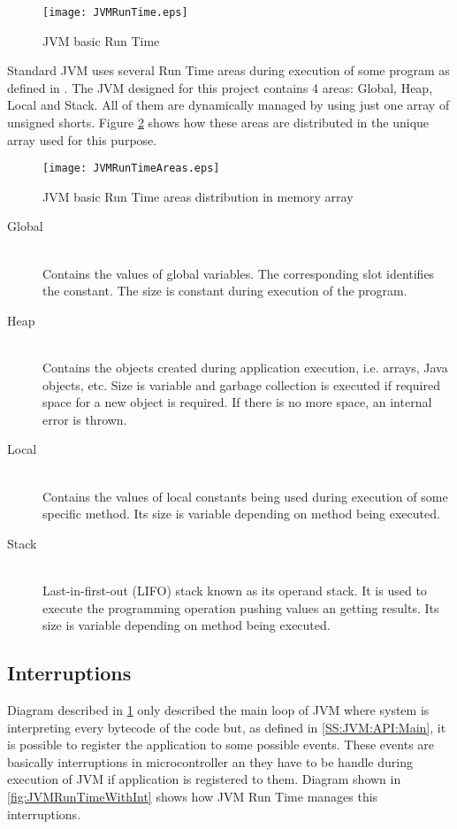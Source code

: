 \begin{figure}[H]
\centering
\texttt{[image: JVMRunTime.eps]}
\caption{JVM basic Run Time}
\label{fig:JVMRunTime}
\end{figure}

Standard JVM uses several Run Time areas during execution of some program as defined in \cite{Art:JVMSE7}. The JVM designed for this project contains 4 areas: Global, Heap, Local and Stack. All of them are dynamically managed by using just one array of unsigned shorts. Figure \ref{fig:JVMRunTimeAreas} shows how these areas are distributed in the unique array used for this purpose.

\begin{figure}[H]
\centering
\texttt{[image: JVMRunTimeAreas.eps]}
\caption{JVM basic Run Time areas distribution in memory array}
\label{fig:JVMRunTimeAreas}
\end{figure}

\begin{description}
\item[Global] \hfill \\
Contains the values of global variables. The corresponding slot identifies the constant. The size is constant during execution of the program.
\item[Heap] \hfill \\
Contains the objects created during application execution, i.e. arrays, Java objects, etc. Size is variable and garbage collection is executed if required space for a new object is required. If there is no more space, an internal error is thrown.
\item[Local] \hfill \\
Contains the values of local constants being used during execution of some specific method. Its size is variable depending on method being executed.
\item[Stack] \hfill \\
Last-in-first-out (LIFO)  stack known as its operand stack. It is used to execute the programming operation pushing values an getting results. Its size is variable depending on method being executed.
\end{description}

\subsection{Interruptions}\label{SS:JVM:RunTime:Int}
Diagram described in \ref{fig:JVMRunTime} only described the main loop of JVM where system is interpreting every bytecode of the code but, as defined in \ref{SS:JVM:API:Main}, it is possible to register the application to some possible events. These events are basically interruptions in microcontroller an they have to be handle during execution of JVM if application is registered to them. Diagram shown in \ref{fig:JVMRunTimeWithInt} shows how JVM Run Time manages this interruptions.

